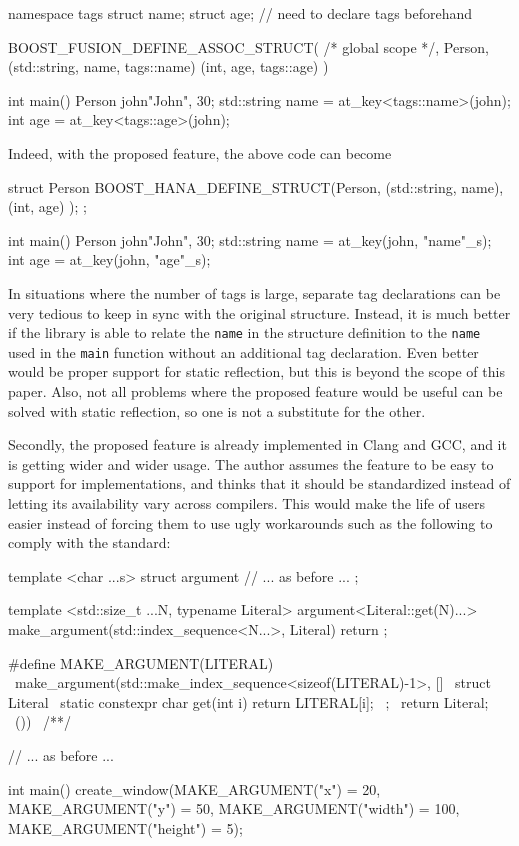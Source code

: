 \documentclass{wg21}
\newcommand{\cc}[1]{\texttt{#1}}
\begin{document}
\begin{cpp}
namespace tags { struct name; struct age; } // need to declare tags beforehand

BOOST_FUSION_DEFINE_ASSOC_STRUCT(
  /* global scope */, Person,
  (std::string, name, tags::name)
  (int, age, tags::age)
)

int main() {
    Person john{"John", 30};
    std::string name = at_key<tags::name>(john);
    int age = at_key<tags::age>(john);
}
\end{cpp}

Indeed, with the proposed feature, the above code can become

\begin{cpp}
struct Person {
  BOOST_HANA_DEFINE_STRUCT(Person,
    (std::string, name),
    (int, age)
  );
};

int main() {
  Person john{"John", 30};
  std::string name = at_key(john, "name"_s);
  int age = at_key(john, "age"_s);
}
\end{cpp}

In situations where the number of tags is large, separate tag declarations can
be very tedious to keep in sync with the original structure. Instead, it is
much better if the library is able to relate the \cc{name} in the structure
definition to the \cc{name} used in the \cc{main} function without an additional
tag declaration. Even better would be proper support for static reflection, but
this is beyond the scope of this paper. Also, not all problems where the proposed
feature would be useful can be solved with static reflection, so one is not a
substitute for the other.

Secondly, the proposed feature is already implemented in Clang and GCC, and it
is getting wider and wider usage. The author assumes the feature to be easy to
support for implementations, and thinks that it should be standardized instead
of letting its availability vary across compilers. This would make the life of
users easier instead of forcing them to use ugly workarounds such as the
following to comply with the standard:

\begin{cpp}
template <char ...s>
struct argument {
  // ... as before ...
};

template <std::size_t ...N, typename Literal>
argument<Literal::get(N)...> make_argument(std::index_sequence<N...>, Literal) {
  return {};
}

#define MAKE_ARGUMENT(LITERAL)                                              \
  make_argument(std::make_index_sequence<sizeof(LITERAL)-1>{}, []{          \
    struct Literal {                                                        \
      static constexpr char get(int i) { return LITERAL[i]; }               \
    };                                                                      \
    return Literal{};                                                       \
  }())                                                                      \
/**/

// ... as before ...

int main() {
  create_window(MAKE_ARGUMENT("x") = 20, MAKE_ARGUMENT("y") = 50,
                MAKE_ARGUMENT("width") = 100, MAKE_ARGUMENT("height") = 5);
}
\end{cpp}
\end{document}
